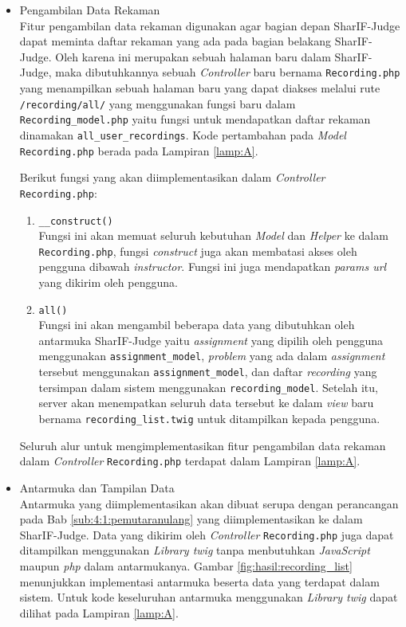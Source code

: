 \begin{itemize}
    \item Pengambilan Data Rekaman \\
    Fitur pengambilan data rekaman digunakan agar bagian depan SharIF-Judge dapat meminta daftar rekaman yang ada pada bagian belakang SharIF-Judge. Oleh karena ini merupakan sebuah halaman baru dalam SharIF-Judge, maka dibutuhkannya sebuah \textit{Controller} baru bernama \verb|Recording.php| yang menampilkan sebuah halaman baru yang dapat diakses melalui rute \verb|/recording/all/| yang menggunakan fungsi baru dalam \verb|Recording_model.php| yaitu fungsi untuk mendapatkan daftar rekaman dinamakan \verb|all_user_recordings|. Kode pertambahan pada \textit{Model} \verb|Recording.php| berada pada Lampiran \ref{lamp:A}.

    Berikut fungsi yang akan diimplementasikan dalam \textit{Controller} \verb|Recording.php|:
    \begin{enumerate}
        \item \verb|__construct()| \\
        Fungsi ini akan memuat seluruh kebutuhan \textit{Model} dan \textit{Helper} ke dalam \verb|Recording.php|, fungsi \textit{construct} juga akan membatasi akses oleh pengguna dibawah \textit{instructor}. Fungsi ini juga mendapatkan \textit{params url} yang dikirim oleh pengguna. 

        \item \verb|all()| \\
        Fungsi ini akan mengambil beberapa data yang dibutuhkan oleh antarmuka SharIF-Judge yaitu \textit{assignment} yang dipilih oleh pengguna menggunakan \verb|assignment_model|, \textit{problem} yang ada dalam \textit{assignment} tersebut menggunakan \verb|assignment_model|, dan daftar \textit{recording} yang tersimpan dalam sistem menggunakan \verb|recording_model|. Setelah itu, server akan menempatkan seluruh data tersebut ke dalam \textit{view} baru bernama \verb|recording_list.twig| untuk ditampilkan kepada pengguna.
    \end{enumerate}

    Seluruh alur untuk mengimplementasikan fitur pengambilan data rekaman dalam \textit{Controller} \verb|Recording.php| terdapat dalam Lampiran \ref{lamp:A}.

    \item Antarmuka dan Tampilan Data \\
    Antarmuka yang diimplementasikan akan dibuat serupa dengan perancangan pada Bab \ref{sub:4:1:pemutaranulang} yang diimplementasikan ke dalam SharIF-Judge. Data yang dikirim oleh \textit{Controller} \verb|Recording.php| juga dapat ditampilkan menggunakan \textit{Library twig} tanpa menbutuhkan \textit{JavaScript} maupun \textit{php} dalam antarmukanya. Gambar \ref{fig:hasil:recording_list} menunjukkan implementasi antarmuka beserta data yang terdapat dalam sistem. Untuk kode keseluruhan antarmuka menggunakan \textit{Library twig} dapat dilihat pada Lampiran \ref{lamp:A}.
\end{itemize}


